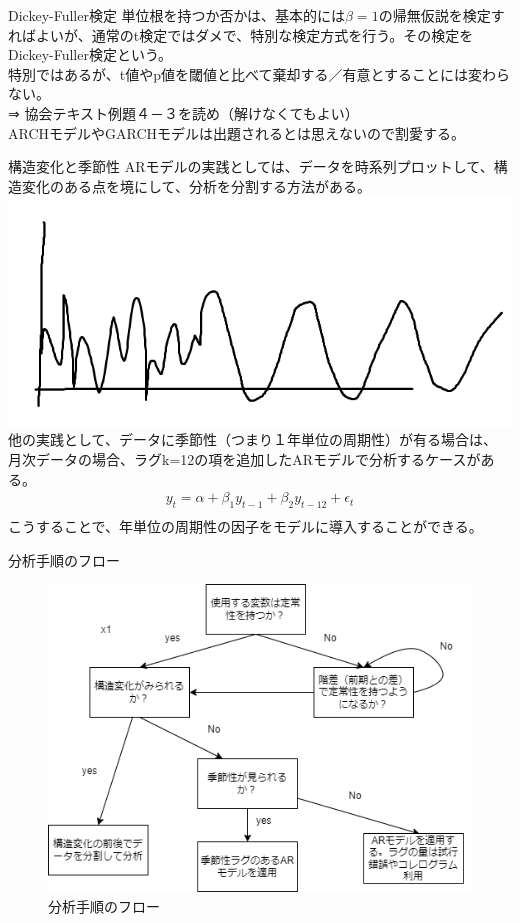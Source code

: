 \documentclass[dvipdfmx,autodetect-engine, unicode, 10pt, aspectratio=169]{beamer}
\begin{document}
\begin{frame}{Dickey-Fuller検定}
    単位根を持つか否かは、基本的には$\beta=1$の帰無仮説を検定すればよいが、通常のt検定ではダメで、特別な検定方式を行う。その検定をDickey-Fuller検定という。\\
    特別ではあるが、t値やp値を閾値と比べて棄却する／有意とすることには変わらない。\\
    ⇒ 協会テキスト例題４－３を読め（解けなくてもよい）\\
    \vspace{10pt}
    ARCHモデルやGARCHモデルは出題されるとは思えないので割愛する。
\end{frame}
\begin{frame}{構造変化と季節性}
    ARモデルの実践としては、データを時系列プロットして、構造変化のある点を境にして、分析を分割する方法がある。\\
    \includegraphics[width=0.4\linewidth]{change_periodic.PNG}\\
    他の実践として、データに季節性（つまり１年単位の周期性）が有る場合は、
    月次データの場合、ラグk=12の項を追加したARモデルで分析するケースがある。
    \begin{align*}
         y_t = \alpha + \beta_1 y_{t-1} + \beta_2 y_{t-12} + \epsilon_t \\
    \end{align*}
    こうすることで、年単位の周期性の因子をモデルに導入することができる。
\end{frame}
\begin{frame}{分析手順のフロー}
    \begin{figure}
        \centering
        \includegraphics[width=0.65\linewidth]{correlogram.drawio.png}
        \caption{分析手順のフロー}
    \end{figure}
    
\end{frame}
\end{document}
